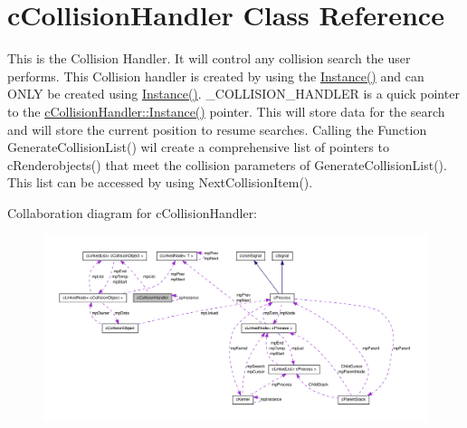 \hypertarget{classc_collision_handler}{
\section{cCollisionHandler Class Reference}
\label{classc_collision_handler}
}


This is the Collision Handler. It will control any collision search the user performs. This Collision handler is created by using the \hyperlink{classc_collision_handler_a04d5c8d5b7ac854b4958dca195bf1c1b}{Instance()} and can ONLY be created using \hyperlink{classc_collision_handler_a04d5c8d5b7ac854b4958dca195bf1c1b}{Instance()}. \_\-COLLISION\_\-HANDLER is a quick pointer to the \hyperlink{classc_collision_handler_a04d5c8d5b7ac854b4958dca195bf1c1b}{cCollisionHandler::Instance()} pointer. This will store data for the search and will store the current position to resume searches. Calling the Function GenerateCollisionList() wil create a comprehensive list of pointers to cRenderobjects() that meet the collision parameters of GenerateCollisionList(). This list can be accessed by using NextCollisionItem().  




Collaboration diagram for cCollisionHandler:\nopagebreak
\begin{figure}[H]
\begin{center}
\leavevmode
\includegraphics[width=400pt]{classc_collision_handler__coll__graph}
\end{center}
\end{figure}
